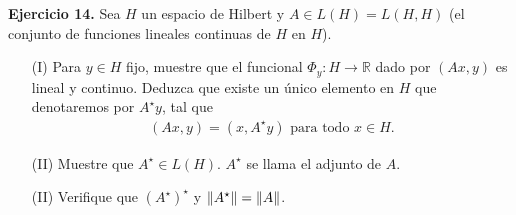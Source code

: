 \textbf{Ejercicio 14.} Sea $H$ un espacio de Hilbert y $A\in L(H)=L(H,H)$ (el conjunto de funciones lineales continuas de $H$ en $H$).
\begin{enumerate}
    \item[(I)] Para $y \in H$ fijo, muestre que el funcional $\Phi_y:H\to \mathbb{R}$ dado por $(Ax,y)$ es lineal y continuo. Deduzca que existe un único elemento en $H$ que denotaremos por $A^\star y$, tal que 
    \begin{align*}
        (Ax,y)=(x,A^\star y) \text{ para todo } x \in H.
    \end{align*}
    \item[(II)] Muestre que $A^\star \in L(H)$. $A^\star$ se llama el adjunto de $A$.
    \item[(II)] Verifique que $(A^\star)^\star$ y $\left\|A^\star\right\|=\left\|A\right\|$.
\end{enumerate}
